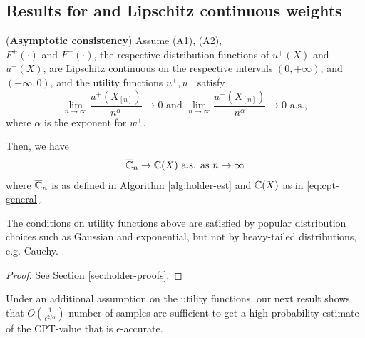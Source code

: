 \subsection{Results for \holder and Lipschitz continuous weights}





\begin{proposition}(\textbf{Asymptotic consistency})
\label{prop:holder-asymptotic}
Assume (A1), (A2),\\
$F^+(\cdot)$ and $F^-(\cdot)$, the respective distribution functions of $u^+(X)$ and $u^-(X)$, 
are Lipschitz continuous on the respective intervals $(0,+\infty)$, and 
$(-\infty, 0)$, and  the utility functions $u^+, u^-$ satisfy 
$$\lim\limits_{n\rightarrow\infty}\frac{u^+(X_{[n]})}{n^{\alpha}}\rightarrow 0 \text{ and }\lim\limits_{n\rightarrow\infty}\frac{u^-(X_{[n]})}{n^{\alpha}}\rightarrow 0 \text{ a.s.},$$
where $\alpha$ is the \holder exponent for $w^{\pm}$.

Then, we have 
\begin{align}
\overline {\mathbb{C}}_n
\rightarrow
\mathbb{C}(X)
 \text{   a.s. as } n\rightarrow \infty
\end{align}
where $\overline {\mathbb{C}}_n$ is as defined in Algorithm \ref{alg:holder-est} and $\mathbb{C}(X)$ as in \eqref{eq:cpt-general}.
\end{proposition}
The conditions on utility functions above are satisfied by popular distribution choices such as Gaussian and exponential, but not by heavy-tailed distributions, e.g. Cauchy.
\begin{proof}
See Section \ref{sec:holder-proofs}. 
\end{proof}
Under an additional assumption on the utility functions,
our next result shows that $O\left(\frac{1}{\epsilon^{2/\alpha}}\right)$ number of samples are sufficient to get a
high-probability estimate of the CPT-value that is $\epsilon$-accurate.

